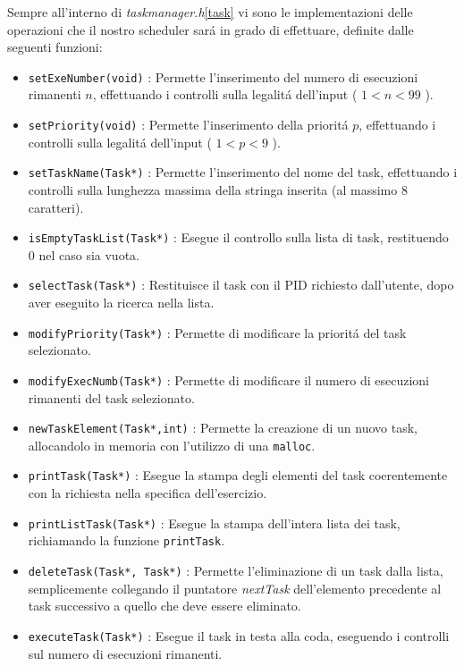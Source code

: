 \documentclass[a4paper]{article}
\begin{document}
Sempre all'interno di \textit{taskmanager.h}\ref{task} vi sono le implementazioni delle operazioni che il nostro scheduler sar\'a in grado di effettuare, definite dalle seguenti funzioni:

\begin{itemize}
\item \texttt{setExeNumber(void)} : Permette l'inserimento del numero di esecuzioni rimanenti $n$, effettuando i controlli sulla legalit\'a dell'input ( $1<n<99$ ).

\item \texttt{setPriority(void)} : Permette l'inserimento della priorit\'a $p$, effettuando i controlli sulla legalit\'a dell'input ( $ 1<p<9$ ).

\item \texttt{setTaskName(Task*)} : Permette l'inserimento del nome del task, effettuando i controlli sulla lunghezza massima della stringa inserita (al massimo 8 caratteri).

\item \texttt{isEmptyTaskList(Task*)} : Esegue il controllo sulla lista di task, restituendo 0 nel caso sia vuota.

\item \texttt{selectTask(Task*)} : Restituisce il task con il PID richiesto dall'utente, dopo aver eseguito la ricerca nella lista.

\item \texttt{modifyPriority(Task*)} : Permette di modificare la priorit\'a del task selezionato. 

\item \texttt{modifyExecNumb(Task*)} : Permette di modificare il numero di esecuzioni rimanenti del task selezionato.

\item \texttt{newTaskElement(Task*,int)} : Permette la creazione di un nuovo task, allocandolo in memoria con l'utilizzo di una \texttt{malloc}.

\item \texttt{printTask(Task*)} : Esegue la stampa degli elementi del task coerentemente con la richiesta nella specifica dell'esercizio.

\item \texttt{printListTask(Task*)} : Esegue la stampa dell'intera lista dei task, richiamando la funzione \texttt{printTask}.

\item \texttt{deleteTask(Task*, Task*)} : Permette l'eliminazione di un task dalla lista, semplicemente collegando il puntatore \textit{nextTask} dell'elemento precedente al task successivo a quello che deve essere eliminato.

\item \texttt{executeTask(Task*)} : Esegue il task in testa alla coda, eseguendo i controlli sul numero di esecuzioni rimanenti.
\end{itemize}
\end{document}
